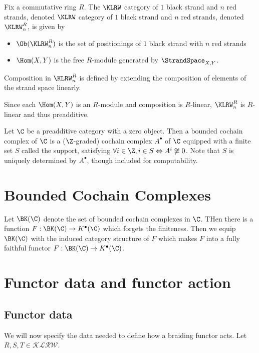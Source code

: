 \begin{definition}
  Fix a commutative ring $R$. The $\KLRW$ category of $1$ black strand
  and $n$ red strands, denoted $\KLRW$ category of $1$ black strand
  and $n$ red strands, denoted $\KLRW^R_n$, is given by
  \begin{itemize}
    \item $\Ob(\KLRW^R_n)$ is the set of positionings of $1$ black strand
    with $n$ red strands
    \item $\Hom(X, Y)$ is the free $R$-module generated by $\StrandSpace_{X, Y}$.
  \end{itemize}
  Composition in $\KLRW^R_n$ is defined by extending the composition of elements of the strand
  space linearly.

  Since each $\Hom(X, Y)$ is an $R$-module and composition is $R$-linear, $\KLRW^R_n$
  is $R$-linear and thus preadditive.
\end{definition}
\begin{definition}
  Let $\C$ be a preadditive category with a zero object. Then a bounded cochain
  complex of $\C$ is a ($\Z$-graded) cochain complex $A^\bullet$ of $\C$ equipped with a finite set
  $S$ called the support, satisfying
  $\forall i\in \Z, i\in S \Leftrightarrow A^i\not\cong 0$. Note that
  $S$ is uniquely determined by $A^\bullet$, though included
  for computability.
\end{definition}

\section{Bounded Cochain Complexes}
\begin{definition}
  Let $\BK(\C)$ denote the set of bounded cochain complexes in $\C$. THen
  there is a function $F:\BK(\C)\to K^\bullet(\C)$ which forgets the finiteness.
  Then we equip $\BK(\C)$ with the induced category structure of $F$ which makes
  $F$ into a fully faithful functor $F:\BK(\C) \to K^\bullet (\C)$.
\end{definition}

\section{Functor data and functor action}

\subsection{Functor data}
We will now specify the data needed to define how a braiding functor acts. Let $R, S, T \in \mathcal{KLRW}$.

